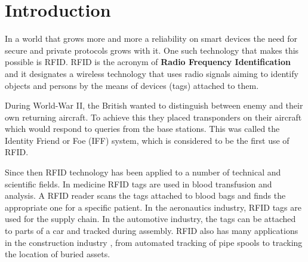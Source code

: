 \chapter*{Introduction} 

    In a world that grows more and more a reliability on smart devices the need for secure and private protocols grows with it. One 
such technology that makes this possible is RFID. RFID is the acronym of \textbf{Radio Frequency Identification} and it designates
a wireless technology that uses radio signals aiming to identify objects and persons by the means of devices (tags) attached to them.

    During World-War II, the British wanted to distinguish between enemy and their own returning aircraft. To achieve this they placed transponders
on their aircraft which would respond to queries from the base stations. This was called the Identity Friend or Foe (IFF) system, which is considered to be the
first use of RFID.

    Since then RFID technology has been applied to a number of technical and scientific fields. In medicine RFID tags are used in blood transfusion and analysis. 
A RFID reader scans the tags attached to blood bags and finds the appropriate one for a specific patient. In the aeronautics industry, 
RFID tags are used for the supply chain. In the automotive industry, the tags can be attached to parts of a car and tracked during assembly.
RFID also has many applications in the construction industry \cite{Domdouzis}, from automated tracking of pipe spools to tracking the 
location of buried assets.